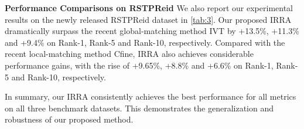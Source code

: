 \documentclass[10pt,twocolumn,letterpaper]{article}
\begin{document}
\textbf{Performance Comparisons on RSTPReid}
We also report our experimental results on the newly released RSTPReid dataset in \cref{tab:3}. Our proposed IRRA dramatically surpass the recent global-matching method IVT\cite{shu2022see} by +13.5\%, +11.3\% and +9.4\% on Rank-1, Rank-5 and Rank-10, respectively. Compared with the recent local-matching method Cfine\cite{yan2022clip}, IRRA also achieves considerable performance gains, with the rise of +9.65\%, +8.8\% and +6.6\% on Rank-1, Rank-5 and Rank-10, respectively.

In summary, our IRRA consistently achieves the best performance for all metrics on all three benchmark datasets. This demonstrates the generalization and robustness of our proposed method.

\begin{table}[t]
  \centering  {}
  \caption{Performance comparisons with state-of-the-art methods on ICFG-PEDES dataset.}
  \label{tab:2}
\end{table}
\end{document}
